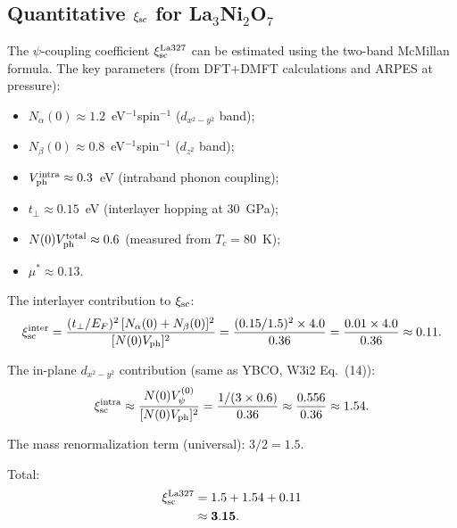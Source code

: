 \documentclass[11pt]{article}
\begin{document}
\subsection{Quantitative $\xi_{\rm sc}$ for La$_3$Ni$_2$O$_7$}

The $\psi$-coupling coefficient $\xi_{\rm sc}^{\rm La327}$ can be estimated
using the two-band McMillan formula. The key parameters (from DFT+DMFT
calculations and ARPES at pressure):
\begin{itemize}
  \item $N_\alpha(0) \approx 1.2$~eV$^{-1}$spin$^{-1}$ ($d_{x^2-y^2}$ band);
  \item $N_\beta(0) \approx 0.8$~eV$^{-1}$spin$^{-1}$ ($d_{z^2}$ band);
  \item $V_{\rm ph}^{\rm intra} \approx 0.3$~eV (intraband phonon coupling);
  \item $t_\perp \approx 0.15$~eV (interlayer hopping at 30~GPa);
  \item $N(0)V_{\rm ph}^{\rm total} \approx 0.6$ (measured from $T_c = 80$~K);
  \item $\mu^* \approx 0.13$.
\end{itemize}

The interlayer contribution to $\xi_{\rm sc}$:
\begin{equation}
\xi_{\rm sc}^{\rm inter} = \frac{(t_\perp/E_F)^2\,[N_\alpha(0)+N_\beta(0)]^2}
  {[N(0)V_{\rm ph}]^2}
= \frac{(0.15/1.5)^2 \times 4.0}{0.36}
= \frac{0.01 \times 4.0}{0.36}
\approx 0.11.
\label{eq:xi-sc-inter}
\end{equation}

The in-plane $d_{x^2-y^2}$ contribution (same as YBCO, W3i2 Eq.~(14)):
\begin{equation}
\xi_{\rm sc}^{\rm intra} \approx \frac{N(0)V_\psi^{(0)}}{[N(0)V_{\rm ph}]^2}
= \frac{1/(3 \times 0.6)}{0.36} \approx \frac{0.556}{0.36} \approx 1.54.
\label{eq:xi-sc-intra-La327}
\end{equation}

The mass renormalization term (universal): $3/2 = 1.5$.

Total:
\begin{align}
\xi_{\rm sc}^{\rm La327}
&= 1.5 + 1.54 + 0.11 \notag\\
&\approx \mathbf{3.15}.
\label{eq:xi-sc-La327}
\end{align}
\end{document}
